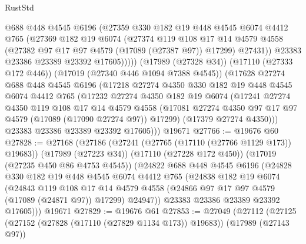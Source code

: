 \begin{lexlean}{RustStd}
\begin{coremodule}
              @688
              @448
              @4545
              @6196
              (@27359
                @330
                @182
                @19
                @448
                @4545
                @6074
                @4412
                @765
                (@27369
                  @182
                  @19
                  @6074
                  (@27374
                    @119
                    @108
                    @17
                    @14
                    @4579
                    @4558
                    (@27382 @97 @17 @97 @4579 (@17089 (@27387 @97)) @17299)
                    @27431))
                @23383
                @23386
                @23389
                @23392
                @17605)))))
      (@17989 (@27328 @34))
      (@17110 (@27333 @172 @446))
      (@17019 (@27340 @446 @1094 @7388 @4545))
      (@17628
        @27274
        @688
        @448
        @4545
        @6196
        (@17218
          @27274
          @4350
          @330
          @182
          @19
          @448
          @4545
          @6074
          @4412
          @765
          (@17232
            @27274
            @4350
            @182
            @19
            @6074
            (@17241
              @27274
              @4350
              @119
              @108
              @17
              @14
              @4579
              @4558
              (@17081 @27274 @4350 @97 @17 @97 @4579 (@17089 (@17090 @27274 @97)) @17299)
              (@17379 @27274 @4350)))
          @23383
          @23386
          @23389
          @23392
          @17605)))
    @19671
@27766 := @19676 @60
@27828 := @27168
    (@27186
      (@27241 (@27765 (@17110 (@27766 @1129 @173)) @19683))
      (@17989 (@27223 @34))
      (@17110 (@27228 @172 @450))
      (@17019 (@27235 @450 @86 @4753 @4545))
      (@24822
        @688
        @448
        @4545
        @6196
        (@24828
          @330
          @182
          @19
          @448
          @4545
          @6074
          @4412
          @765
          (@24838
            @182
            @19
            @6074
            (@24843
              @119
              @108
              @17
              @14
              @4579
              @4558
              (@24866 @97 @17 @97 @4579 (@17089 (@24871 @97)) @17299)
              @24947))
          @23383
          @23386
          @23389
          @23392
          @17605)))
    @19671
@27829 := @19676 @61
@27853 := @27049
    (@27112
      (@27125
        (@27152 (@27828 (@17110 (@27829 @1134 @173)) @19683))
        (@17989 (@27143 @97))

\end{coremodule}
\end{lexlean}
